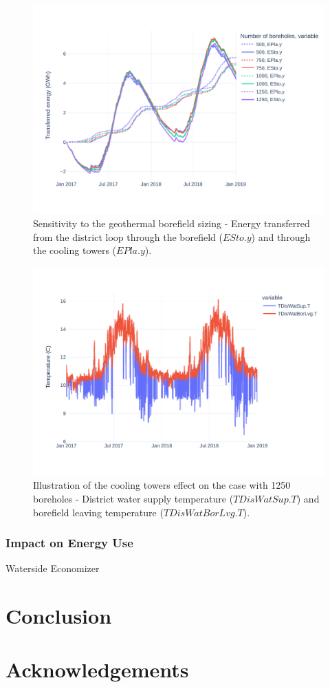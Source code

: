 \begin{figure}[!htbp]
\centering
\includegraphics[width=\linewidth]{figures/GeoSizingE.pdf}
\caption{Sensitivity to the geothermal borefield sizing - Energy transferred from the district loop through the borefield ($ESto.y$) and through the cooling towers ($EPla.y$).}
\label{fig:geo_cooling}
\end{figure}


\begin{figure}[!htbp]
\centering
\includegraphics[width=\linewidth]{figures/GeoBestCaseT.pdf}
\caption{Illustration of the cooling towers effect on the case with 1250 boreholes - District water supply temperature ($TDisWatSup.T$) and borefield leaving temperature ($TDisWatBorLvg.T$).}
\label{fig:coolingeffect}
\end{figure}


\subsubsection{Impact on Energy Use} \label{sec:energy}

Waterside Economizer




\section{Conclusion} \label{sec:concl}



\section{Acknowledgements} \label{sec:acknowledge}
